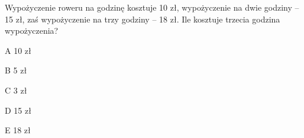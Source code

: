 \begin{tresc}
Wypożyczenie roweru na godzinę kosztuje 10 zł, wypożyczenie na dwie godziny – 15 zł, zaś wypożyczenie na trzy godziny – 18 zł. Ile kosztuje trzecia godzina wypożyczenia?
\end{tresc}
\begin{wariant}{A} 10 zł \end{wariant}
\begin{wariant}{B} 5 zł \end{wariant}
\begin{wariant}{C} 3 zł \end{wariant}
\begin{wariant}{D} 15 zł \end{wariant}
\begin{wariant}{E} 18 zł \end{wariant}
